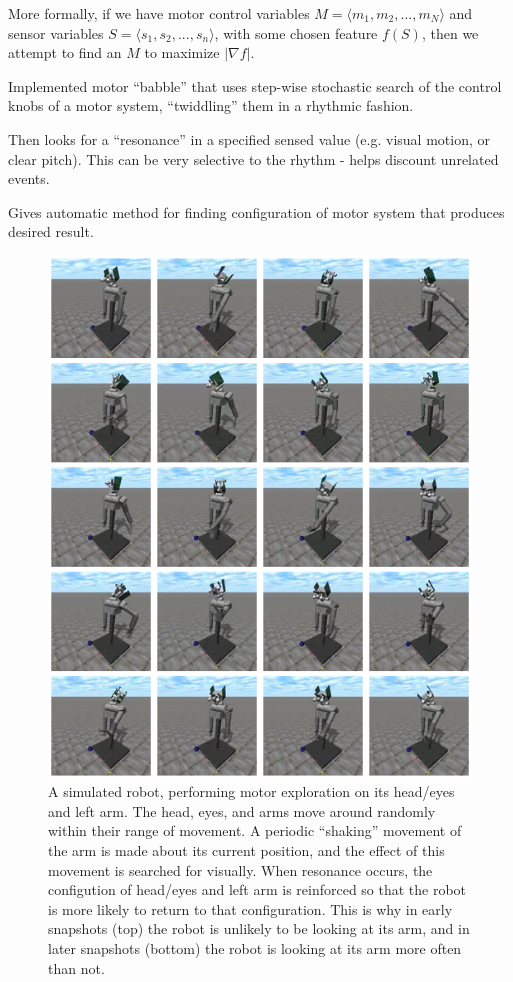 More formally, if we have motor control variables $M=\langle{}m_1,m_2,...,m_N\rangle{}$ and
sensor variables $S=\langle{}s_1,s_2,...,s_n\rangle{}$, 
with some chosen feature $f(S)$,
then we attempt to find an $M$ to maximize $|\nabla{}f|$.


Implemented motor ``babble'' that uses step-wise stochastic search of
the control knobs of a motor system, ``twiddling'' them in a rhythmic
fashion.

Then looks for a ``resonance'' in a specified sensed value
(e.g. visual motion, or clear pitch).  This can be very selective to
the rhythm - helps discount unrelated events.

Gives automatic method for finding configuration of motor system that
produces desired result.


\begin{figure}[p]
\centerline{\includegraphics[width=\textwidth]{images/find-arm}}
\caption{
%
A simulated robot, performing motor exploration on its
head/eyes and left arm.  The head, eyes, and arms move around randomly
within their range of movement.
%
A periodic ``shaking'' movement of the arm is made about its
current position, and the effect of this movement is searched 
for visually.
%
When resonance occurs, the configution of head/eyes and left arm
is reinforced so that the robot is more likely to return to that
configuration.
%
This is why 
in early snapshots (top) the robot is unlikely to be looking at 
its arm, and in later snapshots (bottom) the robot is looking at
its arm more often than not.
%
}
\end{figure}

